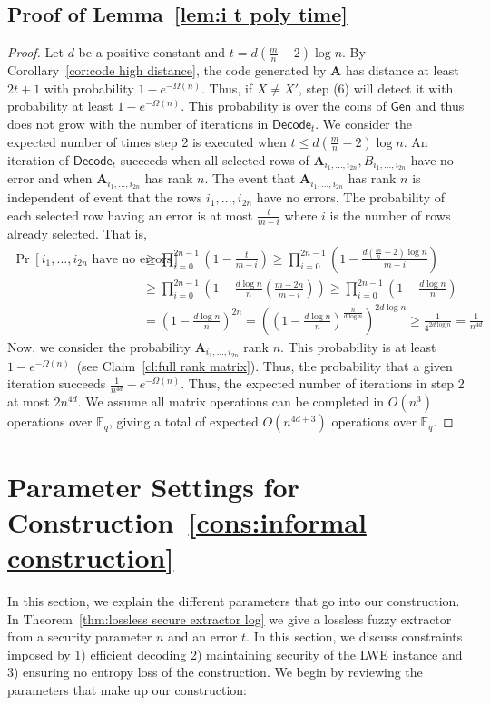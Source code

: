 \documentclass[11pt]{article}
\newcommand{\thref}[1]{\mbox{Theorem~\ref{#1}}}
\newcommand{\corref}[1]{\mbox{Corollary~\ref{#1}}}
\newcommand{\lemref}[1]{\mbox{Lemma~\ref{#1}}}
\newcommand{\clref}[1]{\mbox{Claim~\ref{#1}}}
\newcommand{\consref}[1]{\mbox{Construction~\ref{#1}}}
\newcommand{\class}[1]{{\ensuremath{\mathsf{#1}}}}
\newcommand{\gen}{\ensuremath{\class{Gen}}\xspace}
\newcommand{\vect}[1]{\ensuremath{\textbf{#1}}}
\newcommand{\Fq}{\ensuremath{\mathbb{F}_q}}
\newcommand{\decode}{\ensuremath{\mathsf{Decode}}}
\newcommand{\vA}{\vect{A}}
\begin{document}
\subsection{Proof of \lemref{lem:i t poly time}}
\label{sec:proof lem i t poly time}
\begin{proof}
Let $d$ be a positive constant and $t = d\left( \frac{m}{n}-2\right)\log n$.  
By \corref{cor:code high distance}, the code generated by $\vA$ has distance at least $2t+1$ with probability $1-e^{-\Omega(n)}$.  Thus, if $X\neq X'$, step (6) will detect it with probability at least $1-e^{-\Omega(n)}$.  This probability is over the coins of $\gen$ and thus does not grow with the number of iterations in $\decode_t$.  We consider the expected number of times step 2 is executed when $t\leq d\left(\frac{m}{n}-2\right)\log n$. 
An iteration of $\decode_t$ succeeds when all selected rows of $\vA_{i_1,..., i_{2n}}, B_{i_1,..., i_{2n}}$ have no error and when  $\vA_{i_1,..., i_{2n}}$ has rank $n$.  The event that $\vA_{i_1,..., i_{2n}}$ has rank $n$ is independent of event that the rows $i_1,...,i_{2n}$ have no errors.  The probability of each selected row having an error is at most $\frac{t}{m - i}$ where $i$ is the number of rows already selected.  That is,
\begin{align*}
\Pr[i_1,..., i_{2n}\text{ have no errors}]&\geq \prod_{i=0}^{2n-1}\left(1 - \frac{t}{m-i}\right)\geq \prod_{i=0}^{2n-1}\left( 1-\frac{d\left(\frac{m}{n}-2\right)\log n}{m-i}\right)\\
&\geq  \prod_{i=0}^{2n-1}\left( 1-\frac{d\log n}{n}\left(\frac{m-2n}{m-i}\right)\right)\geq \prod_{i=0}^{2n-1}\left( 1-\frac{d\log n}{n}\right) \\
&= \left(1-\frac{d\log n}{n}\right)^{2n}  = \left(\left(1-\frac{d\log n}{n}\right)^{\frac{n}{d\log n}}\right)^{2d\log n}\geq \frac{1}{4^{2d\log n}} = \frac{1}{n^{4d}}
\end{align*}
Now, we consider the probability  $\vA_{i_1,..., i_{2n}}$  rank $n$.  This probability is at least $1-e^{-\Omega(n)}$~(see \clref{cl:full rank matrix}).  Thus, the probability that a given iteration succeeds $\frac{1}{n^{4d}} - e^{-\Omega(n)}$.  
Thus, the expected number of iterations in step 2 at most  $2n^{4d}$.  We assume all matrix operations can be completed in  $O(n^3)$ operations over $\Fq$, giving a total of expected $O(n^{4d+3})$ operations over $\Fq$.  
\end{proof}

\section{Parameter Settings for \consref{cons:informal construction}}
\label{sec:parameter settings}
In this section, we explain the different parameters that go into our construction.  In \thref{thm:lossless secure extractor log} we give a lossless fuzzy extractor from a security parameter $n$ and an error $t$.  In this section, we discuss constraints imposed by 1) efficient decoding 2) maintaining security of the LWE instance and 3) ensuring no entropy loss of the construction.  We begin by reviewing the parameters that make up our construction:
\end{document}
